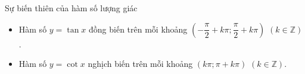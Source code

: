 \begin{dang}{Sự biến thiên của hàm số lượng giác}
\begin{itemize}
	\item Hàm số $y = \tan x$ đồng biến trên mỗi khoảng $\left(-\dfrac{\pi}{2}+k\pi;\dfrac{\pi}{2}+k\pi\right)$ $(k \in \mathbb{Z})$. 
	\item Hàm số $y = \cot x$ nghịch biến trên mỗi khoảng $\left(k\pi;\pi+k\pi\right)$ $(k \in \mathbb{Z})$. 
\end{itemize}
\end{dang}
\viduminhhoa


